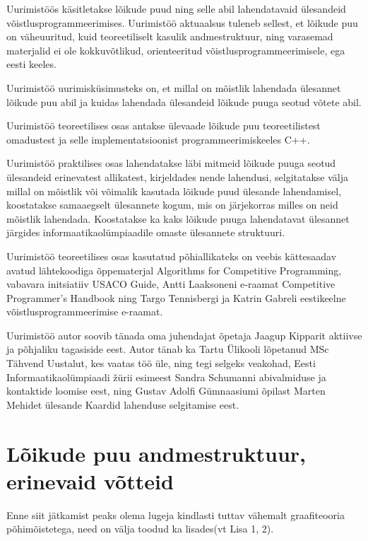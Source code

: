 \documentclass{trkut}
\theoremstyle{definition}
\begin{document}
\maketitle%
\tableofcontents%

Uurimistöös käsitletakse lõikude puud ning selle abil lahendatavaid ülesandeid võistlusprogrammeerimises. Uurimistöö aktuaalsus tuleneb sellest, et lõikude puu on väheuuritud, kuid teoreetiliselt kasulik andmestruktuur, ning varasemad materjalid ei ole kokkuvõtlikud, orienteeritud võistlusprogrammeerimisele, ega eesti keeles.

Uurimistöö uurimisküsimusteks on, et millal on mõistlik lahendada ülesannet lõikude puu abil ja kuidas lahendada ülesandeid lõikude puuga seotud võtete abil.

Uurimistöö teoreetilises osas antakse ülevaade lõikude puu teoreetilistest omadustest ja selle implementatsioonist programmeerimiskeeles C++.

Uurimistöö praktilises osas lahendatakse läbi mitmeid lõikude puuga seotud ülesandeid erinevatest allikatest, kirjeldades nende lahendusi, selgitatakse välja millal on mõistlik või võimalik kasutada lõikude puud ülesande lahendamisel, koostatakse samaaegselt ülesannete kogum, mis on järjekorras milles on neid mõistlik lahendada. Koostatakse ka kaks lõikude puuga lahendatavat ülesannet järgides informaatikaolümpiaadile omaste ülesannete struktuuri.

Uurimistöö teoreetilises osas kasutatud põhiallikateks on veebis kättesaadav avatud lähtekoodiga õppematerjal Algorithms for Competitive Programming, vabavara initsiatiiv USACO Guide, Antti Laaksoneni e-raamat Competitive Programmer’s Handbook ning Targo Tennisbergi ja Katrin Gabreli eestikeelne võistlusprogrammeerimise e-raamat.

Uurimistöö autor soovib tänada oma juhendajat õpetaja Jaagup Kipparit aktiivse ja põhjaliku tagasiside eest. 
Autor tänab ka Tartu Ülikooli lõpetanud MSc Tähvend Uustalut, kes vaatas töö üle, ning tegi selgeks veakohad, Eesti Informaatikaolümpiaadi žürii esimeest Sandra Schumanni abivalmiduse ja kontaktide loomise eest, ning Gustav Adolfi Gümnaasiumi õpilast Marten Mehidet ülesande Kaardid lahenduse selgitamise eest.

\chapter{Lõikude puu andmestruktuur, erinevaid võtteid}
Enne siit jätkamist peaks olema lugeja kindlasti tuttav vähemalt graafiteooria põhimõistetega, need on välja toodud ka lisades(vt Lisa 1, 2).
\end{document}
